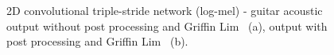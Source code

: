 \begin{figure}[htb!]
    \centering
    \captionsetup{justification=centering}
    \caption{2D convolutional triple-stride network (log-mel) - guitar acoustic output without post processing and Griffin Lim ~(a), output with post processing and Griffin Lim ~(b).}
    \label{fig:apx_mel_triple_gf}
\end{figure}